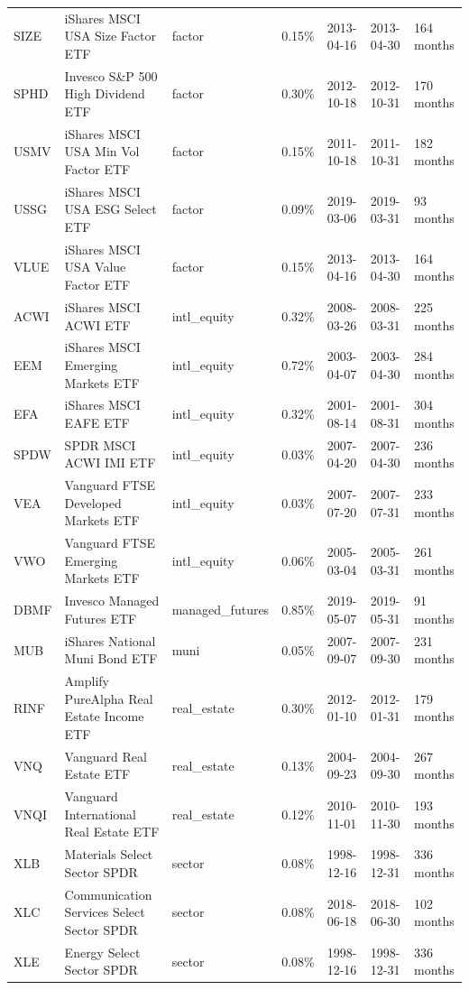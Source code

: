 \begin{tabularx}{\textwidth}{@{}P{0.46in}P{1.06in}P{0.62in}P{0.48in}P{0.50in}P{0.54in}Y@{}}
SIZE & iShares MSCI USA Size Factor ETF & factor & 0.15\% & 2013-04-16 & 2013-04-30 & 164 months \\
SPHD & Invesco S\&P 500 High Dividend ETF & factor & 0.30\% & 2012-10-18 & 2012-10-31 & 170 months \\
USMV & iShares MSCI USA Min Vol Factor ETF & factor & 0.15\% & 2011-10-18 & 2011-10-31 & 182 months \\
USSG & iShares MSCI USA ESG Select ETF & factor & 0.09\% & 2019-03-06 & 2019-03-31 & 93 months \\
VLUE & iShares MSCI USA Value Factor ETF & factor & 0.15\% & 2013-04-16 & 2013-04-30 & 164 months \\
ACWI & iShares MSCI ACWI ETF & intl\_equity & 0.32\% & 2008-03-26 & 2008-03-31 & 225 months \\
EEM & iShares MSCI Emerging Markets ETF & intl\_equity & 0.72\% & 2003-04-07 & 2003-04-30 & 284 months \\
EFA & iShares MSCI EAFE ETF & intl\_equity & 0.32\% & 2001-08-14 & 2001-08-31 & 304 months \\
SPDW & SPDR MSCI ACWI IMI ETF & intl\_equity & 0.03\% & 2007-04-20 & 2007-04-30 & 236 months \\
VEA & Vanguard FTSE Developed Markets ETF & intl\_equity & 0.03\% & 2007-07-20 & 2007-07-31 & 233 months \\
VWO & Vanguard FTSE Emerging Markets ETF & intl\_equity & 0.06\% & 2005-03-04 & 2005-03-31 & 261 months \\
DBMF & Invesco Managed Futures ETF & managed\_futures & 0.85\% & 2019-05-07 & 2019-05-31 & 91 months \\
MUB & iShares National Muni Bond ETF & muni & 0.05\% & 2007-09-07 & 2007-09-30 & 231 months \\
RINF & Amplify PureAlpha Real Estate Income ETF & real\_estate & 0.30\% & 2012-01-10 & 2012-01-31 & 179 months \\
VNQ & Vanguard Real Estate ETF & real\_estate & 0.13\% & 2004-09-23 & 2004-09-30 & 267 months \\
VNQI & Vanguard International Real Estate ETF & real\_estate & 0.12\% & 2010-11-01 & 2010-11-30 & 193 months \\
XLB & Materials Select Sector SPDR & sector & 0.08\% & 1998-12-16 & 1998-12-31 & 336 months \\
XLC & Communication Services Select Sector SPDR & sector & 0.08\% & 2018-06-18 & 2018-06-30 & 102 months \\
XLE & Energy Select Sector SPDR & sector & 0.08\% & 1998-12-16 & 1998-12-31 & 336 months \\

\end{tabularx}
